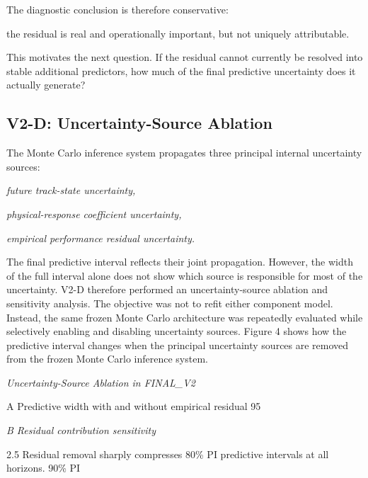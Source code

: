 The diagnostic conclusion is therefore conservative:

the residual is real and operationally important, but not uniquely attributable.

This motivates the next question. If the residual cannot currently be resolved into stable additional predictors, how much of the final predictive uncertainty does it actually generate?

\subsection{V2-D: Uncertainty-Source Ablation}
\label{sec:ablation}
The Monte Carlo inference system propagates three principal internal uncertainty sources:

\begin{center}\textit{future track-state uncertainty,}\end{center}

\begin{center}\textit{physical-response coefficient uncertainty,}\end{center}

\begin{center}\textit{empirical performance residual uncertainty.}\end{center}

The final predictive interval reflects their joint propagation. However, the width of the full interval alone does not show which source is responsible for most of the uncertainty. V2-D therefore performed an uncertainty-source ablation and sensitivity analysis. The objective was not to refit either component model. Instead, the same frozen Monte Carlo architecture was repeatedly evaluated while selectively enabling and disabling uncertainty sources. Figure 4 shows how the predictive interval changes when the principal uncertainty sources are removed from the frozen Monte Carlo inference system.

\begin{center}\textit{Uncertainty-Source Ablation in FINAL\_V2}\end{center}

A Predictive width with and without empirical residual 95

\begin{center}\textit{B Residual contribution sensitivity}\end{center}

2.5 Residual removal sharply compresses 80\% PI predictive intervals at all horizons. 90\% PI

